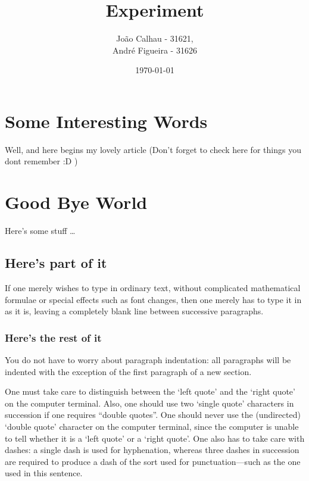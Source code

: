 \documentclass[a4paper,12pt]{article} %
\author{João Calhau - 31621,\\ André Figueira - 31626} %
\title{Experiment} %
\date{\today}
\begin{document}
\maketitle %
\tableofcontents %

\newpage

\section{Some Interesting Words} %
Well, and here begins my lovely article
\newline %
(Don't forget to check here for things you dont remember :D )

\newpage %

\section{Good Bye World} %

Here's some stuff \ldots{}

\subsection{Here's part of it} %

If one merely wishes to type in ordinary text, without
complicated mathematical formulae or special effects such
as font changes, then one merely has to type it in as it
is, leaving a completely blank line between successive
paragraphs.

\subsubsection{Here's the rest of it} %

You do not have to worry about paragraph indentation:
all paragraphs will be indented with the exception of
the first paragraph of a new section.

One must take care to distinguish between the `left quote'
and the `right quote' on the computer terminal.  Also, one
should use two `single quote' characters in succession if
one requires ``double quotes''.  One should never use the
(undirected) `double quote' character on the computer
terminal, since the computer is unable to tell whether it
is a `left quote' or a `right quote'.  One also has to
take care with dashes: a single dash is used for
hyphenation, whereas three dashes in succession are required
to produce a dash of the sort used for punctuation---such as
the one used in this sentence.
\end{document}
